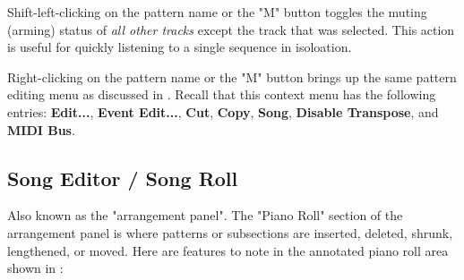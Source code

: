    Shift-left-clicking on the pattern name or the "M" button toggles the muting
   (arming) status of \textsl{all other tracks} except the track that was
   selected.  This action is useful for quickly listening to a single sequence
   in isoloation.

   Right-clicking on the pattern name or the "M" button brings up the same
   pattern editing menu as discussed in
   .
   Recall that this context menu has the following entries:
   \textbf{Edit...}, \textbf{Event Edit...}, \textbf{Cut}, \textbf{Copy},
   \textbf{Song}, \textbf{Disable Transpose}, and \textbf{MIDI Bus}.

\subsection{Song Editor / Song Roll}
\label{subsec:song_editor_arrangement_panel}

   Also known as the "arrangement panel".
   The "Piano Roll" section of the arrangement panel is where patterns or
   subsections are inserted, deleted, shrunk, lengthened, or moved.
   Here are features to note in the annotated piano roll area
   shown in :


